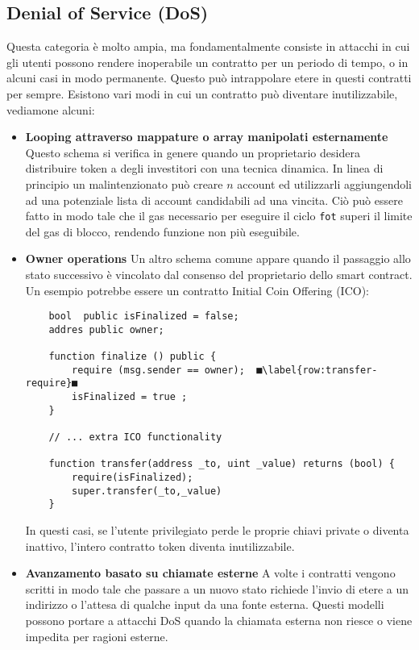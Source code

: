 \subsection*{Denial of Service (DoS)}
Questa categoria è molto ampia, ma fondamentalmente consiste in attacchi in cui gli utenti possono rendere inoperabile un contratto per un periodo di tempo, o in alcuni casi in modo permanente. Questo può intrappolare etere in questi contratti per sempre. Esistono vari modi in cui un contratto può diventare inutilizzabile, vediamone alcuni:
\begin{itemize}
	\item \textbf{Looping attraverso mappature o array manipolati esternamente} Questo schema si verifica in genere quando un proprietario desidera distribuire token a degli investitori con una tecnica dinamica. In linea di principio un malintenzionato può creare $n$ account ed utilizzarli aggiungendoli ad una potenziale lista di account candidabili ad una vincita. Ciò può essere fatto in modo tale che il gas necessario per eseguire il ciclo \lstinline|fot| superi il limite del gas di blocco, rendendo funzione non più eseguibile.
	\item \textbf{Owner operations} Un altro schema comune appare quando il passaggio allo stato successivo è vincolato dal consenso del proprietario dello smart contract. Un esempio potrebbe essere un contratto Initial Coin Offering (ICO):
	\begin{lstlisting}
	bool  public isFinalized = false;
	addres public owner;
	
	function finalize () public {
		require (msg.sender == owner);	■\label{row:transfer-require}■
		isFinalized = true ;
	}
	
	// ... extra ICO functionality
	
	function transfer(address _to, uint _value) returns (bool) {
		require(isFinalized);
		super.transfer(_to,_value)
	} 
	\end{lstlisting}
	In questi casi, se l'utente privilegiato perde le proprie chiavi private o diventa inattivo, l'intero contratto token diventa inutilizzabile.
	
	\item \textbf{Avanzamento basato su chiamate esterne} A volte i contratti vengono scritti in modo tale che passare a un nuovo stato richiede l'invio di etere a un indirizzo o l'attesa di qualche input da una fonte esterna. Questi modelli possono portare a attacchi DoS quando la chiamata esterna non riesce o viene impedita per ragioni esterne.
\end{itemize}
